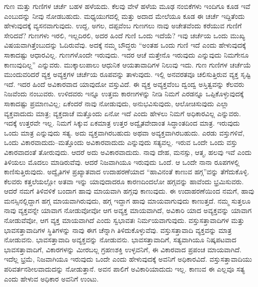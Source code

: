ಗುಣ ಮತ್ತು ಗುಣಿಗಳ ಚರ್ಚೆ ಬಹಳ ಹಳೆಯದು. ಕೆಲವು ವೇಳೆ ಹಳೆಯ ಮೂಢ ನಂಬಿಕೆಗಳು ಇಂದಿಗೂ ಕೂಡ ಇವೆ ಎಂಬುದನ್ನು ನೀವು ನೋಡಬಹುದು. ಮಧ್ಯಯುಗದಲ್ಲಿ ಮತ್ತು ಅದಾದ ಮೇಲೆಯೂ ಕೂಡ ಈ ಚರ್ಚೆ ಇದ್ದಿತೆಂದು ಹೇಳುವುದಕ್ಕೆ ವ್ಯಸನವಾಗುವುದು. ಉದ್ದ, ಅಗಲ, ದಪ್ಪವೆಂಬ ಗುಣಗಲು ನಾವು ಅಚೇತವೆಂದು ಕರೆಯುವ ಗುಣಿಗೆ ಸೇರಿದವೆ? ಗುಣಗಳು ಇರಲಿ, ಇಲ್ಲದಿರಲಿ, ಅದರ ಹಿಂದೆ ಗುಣಿ ಒಂದು ಇದೆಯೆ? ಇವು ಚರ್ಚೆಯ ಒಂದು ಮುಖ್ಯ ವಿಷಯವಾಗಿತ್ತೆಂಬುದನ್ನು ಓದಿರುವೆವು. ಅದಕ್ಕೆ ನಮ್ಮ ಬೌದ್ಧರು “ಅಂತಹ ಒಂದು ಗುಣಿ ಇದೆ ಎಂದು ಹೇಳುವುದಕ್ಕೆ ಸಾಕಾದಷ್ಟು ಆಧಾರವಿಲ್ಲ. ಗುಣಗಳೊಂದೇ ಇರುವುದು. ಇದರ ಆಚೆ ಮತ್ತೇನೊ ಇರುವುದು ಎನ್ನುವುದು ನಿಮಗೇನೂ ಕಾಣುವುದಿಲ್ಲ” ಎನ್ನುವರು. ಮುಕ್ಕಾಲುಪಾಲು ಆಧುನಿಕ ಆಯತಾವಾದಿಗಳ ನಿಲುವು ಇದು. ಗುಣ ಗುಣಿಗಳ ಚರ್ಚೆಯೆ ಮುಂದುವರಿದರೆ ವ್ಯಕ್ತ ಅವ್ಯಕ್ತಗಳ ಚರ್ಚೆಯ ರೂಪವನ್ನು ತಾಳುವುದು. ಇಲ್ಲಿ ಅನವರತವೂ ಚಲಿಸುತ್ತಿರುವ ವ್ಯಕ್ತ ಸೃಷ್ಟಿ ಇದೆ. ಇದರ ಹಿಂದೆ ಅವಿಕಾರವಾದ ಯಾವುದೋ ವಸ್ತುವಿದೆ. ಈ ವ್ಯಕ್ತ ಅವ್ಯಕ್ತವೆಂಬ ದ್ವಂದ್ವ ಅಸ್ತಿತ್ವವನ್ನು ಕೆಲವರು ನಿಜವೆಂದು ನಂಬುವರು. ಉಳಿದವರು ಇನ್ನೂ ಉತ್ತಮ ಕಾರಣಗಳನ್ನು ನೀಡಿ ನಿಮಗೆ ಎರಡನ್ನೂ ಒಪ್ಪಿಕೊಳ್ಳುವುದಕ್ಕೆ ಸಾಕಾದಷ್ಟು ಪ್ರಮಾಣವಿಲ್ಲ; ಏಕೆಂದರೆ ನಾವು ನೋಡುವುದು, ಅನುಭವಿಸುವುದು, ಆಲೋಚಿಸುವುದು ಎಲ್ಲಾ ವ್ಯಕ್ತವಾದುದು ಮಾತ್ರ; ವ್ಯಕ್ತದಾಚೆ ಮತ್ತೊಂದು ಏನೋ ಇದೆ ಎಂದು ಹೇಳಲು ನಿಮಗೆ ಅಧಿಕಾರವಿಲ್ಲ ಎನ್ನುವರು. ಇದಕ್ಕೆ ಉತ್ತರವೇ ಇಲ್ಲ. ನಿಮಗೆ ಸಿಕ್ಕುವ ಏಕಮಾತ್ರ ಉತ್ತರ ಅದ್ವೈತವೇದಾಂತ ಸಿದ್ಧಾಂತದಿಂದ ಮಾತ್ರ. ಇರುವುದು ಒಂದು ಮಾತ್ರ ಎನ್ನುವುದು ಸತ್ಯ. ಅದು ವ್ಯಕ್ತವಾಗಿರಬಹುದು ಅಥವಾ ಅವ್ಯಕ್ತವಾಗಿರಬಹುದು. ಎರಡು ವಸ್ತುಗಳಿವೆ, ಒಂದು ವಿಕಾರವಾದುದು–ಮತ್ತೊಂದು ಅವಿಕಾರವಾದುದು ಎನ್ನುವುದು ಸತ್ಯವಲ್ಲ. ಇರುವ ಒಂದೇ ಒಂದು ವಸ್ತು ವಿಕಾರವಾದಂತೆ ತೋರುವುದು. ಆದರೆ ಅದು ಅವಿಕಾರವಾದುದು. ನಾವು ದೇಹ, ಮನಸ್ಸು, ಆತ್ಮ, ಹಲವು ಇವೆ ಎಂದು ತಿಳಿಯಲು ಮೊದಲು ಮಾಡಿರುವೆವು. ಆದರೆ ನಿಜವಾಗಿಯೂ ಇರುವುದು ಒಂದೆ. ಆ ಒಂದೇ ನಾನಾ ರೂಪಗಳಲ್ಲಿ ಕಾಣಿಸುತ್ತಿರುವುದು. ಅದ್ವೈತಿಗಳ ಪ್ರಖ್ಯಾತವಾದ ಉದಾಹರಣೆಯಾದ “ಹಾವಿನಂತೆ ಕಾಣುವ ಹಗ್ಗ”ವನ್ನು ತೆಗೆದುಕೊಳ್ಳಿ. ಕೆಲವರು ಕತ್ತಲೆಯಲ್ಲೋ ಅತವಾ ಇನ್ನು ಯಾವುದಾದರೂ ಕಾರಣದಿಂದಲೋ ಹಗ್ಗವನ್ನು ಹಾವೆಂದು ಭ್ರಮಿಸುವರು. ಆದರೆ ನಮಗೆ ತಿಳಿವಳಿಕೆ ಬಂದಾಗ ಹಾವು ಮಾಯವಾಗಿ ಹಗ್ಗವು ಕಾಣುವುದು. ಈ ಉದಾಹರಣೆಯಿಂದ ನಮಗೆ, ಹಾವು ಮನಸ್ಸಿನಲ್ಲಿದ್ದಾಗ ಹಗ್ಗ ಮಾಯವಾಗಿರುವುದು, ಹಗ್ಗ ಇದ್ದಾಗ ಹಾವು ಮಾಯವಾಗುವುದು ಕಾಣುತ್ತದೆ. ನಮ್ಮ ಸುತ್ತಲೂ ನಾವು ವ್ಯಕ್ತವನ್ನೇ ಯಾವಾಗ ನೋಡುವೋವೋ ಆಗ ಅವ್ಯಕ್ತ ಮಾಯವಾಗಿದೆ, ಅವಿಕಾರಿ ಯಾದ ಅವ್ಯಕ್ತವನ್ನು ಯಾವಾಗ ನೋಡುವೆವೋ, ಆಗ ವ್ಯಕ್ತ ಮಾಯವಾಗಿದೆ ಎಂದು ಸ್ವಭಾವತಃ ನಿರ್ಮಯವಾಗುವುದು. ವಸ್ತುಸತ್ತಾವಾದಿಗಳ ಮತ್ತು ಭಾವಸತ್ತಾವಾದಿಗಳ ಸ್ಥಿತಿಗಳನ್ನು ನಾವು ಈಗ ಚೆನ್ನಾಗಿ ತಿಳಿದುಕೊಳ್ಳುವೆವು. ವಸ್ತುಸತ್ತಾವಾದಿ ವ್ಯಕ್ತವನ್ನು ಮಾತ್ರ ನೋಡುವನು. ಭಾವಸತ್ತಾವಾದಿ ಅವ್ಯಕ್ತವನ್ನು ನೋಡುವನು. ಭಾವಸತ್ತಾವಾದಿಗೆ, ಸತ್ಯವಾಗಿಯೂ ನಿಷ್ಕಪಟವಾದ ಭಾವಸತ್ತಾವಾದಿಗೆ, ವಿಕಾರಗಳನ್ನು ಮೀರಬಲ್ಲ ಗ್ರಹಣಶಕ್ತಿ ಉಳ್ಳವನಿಗೆ, ಈ ವಿಕಾರವಾದ ಪ್ರಪಂಚ ಮಾಯವಾಗಿದೆ. ಇದೆಲ್ಲ ಭ್ರಮೆ, ನಿಜವಾಗಿಯೂ ಇರುವುದು ಒಂದೇ ಎಂದು ಹೇಳುವುದಕ್ಕೆ ಅವನಿಗೆ ಅಧಿಕಾರವಿದೆ. ವಸ್ತುಸತ್ತಾವಾದಿಯು ಪರಿವರ್ತನಶೀಲವಾದುದನ್ನು ನೋಡುತ್ತಾನೆ. ಅವನ ಪಾಲಿಗೆ ಅವಿಕಾರಿಯಾದುದು ಇಲ್ಲ. ಕಾಣುವ ಈ ಎಲ್ಲವೂ ಸತ್ಯ ಎಂದು ಹೇಳುವ ಅಧಿಕಾರ ಅವನಿಗೆ ಉಂಟು. 

